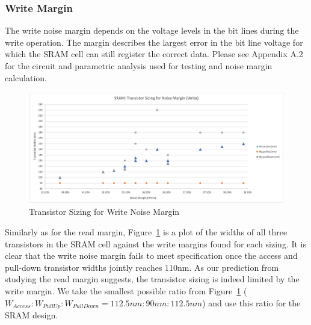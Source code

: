 \documentclass[10pt,letterpaper,onecolumn]{article}
\begin{document}
\subsubsection{Write Margin}
The write noise margin depends on the voltage levels in the bit lines during the write operation. The margin describes the largest error in the bit line voltage for which the SRAM cell can still register the correct data. Please see Appendix A.2 for the circuit and parametric analysis used for testing and noise margin calculation.
\begin{figure}[h!]
\centering
\includegraphics[clip,width=\columnwidth]{Problem2-NM_Write.png}
\caption{Transistor Sizing for Write Noise Margin}
\label{fig:NM_Write}
\end{figure}
Similarly as for the read margin, Figure~\ref{fig:NM_Write} is a plot of the widths of all three transistors in the SRAM cell against the write margins found for each sizing. It is clear that the write noise margin fails to meet specification once the access and pull-down transistor widths jointly reaches 110nm. As our prediction from studying the read margin suggests, the transistor sizing is indeed limited by the write margin.
We take the smallest possible ratio from Figure~\ref{fig:NM_Write} ($W_{Access}:W_{PullUp}:W_{PullDown} = 112.5nm:90nm:112.5nm$) and use this ratio for the SRAM design.
\end{document}
